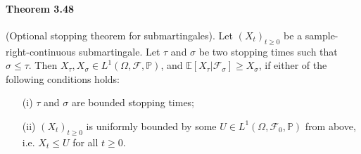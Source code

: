 \documentclass{article}
\numberwithin{equation}{section}
\newcommand{\E}{\mathbb{E}}
\renewcommand{\P}{\mathbb{P}}
\theoremstyle{plain}
\theoremstyle{definition}
\begin{document}
\paragraph{Theorem 3.48\label{thm:3.48}} (Optional stopping theorem for submartingales). Let $(X_t)_{t\geq 0}$ be a sample-right-continuous submartingale. Let $\tau$ and $\sigma$ be two stopping times such that $\sigma\leq\tau$. Then $X_\tau,X_\sigma\in L^1(\Omega,\mathscr{F},\P)$, and $\E[X_\tau|\mathscr{F}_\sigma]\geq X_\sigma$, if either of the following conditions holds:
\begin{itemize}
	\item[(i)] $\tau$ and $\sigma$ are bounded stopping times;
	\item[(ii)] $(X_t)_{t\geq 0}$ is uniformly bounded by some $U\in L^1(\Omega,\mathscr{F}_0,\P)$ from above, i.e. $X_t\leq U$ for all $t\geq 0$.
\end{itemize}
\end{document}

